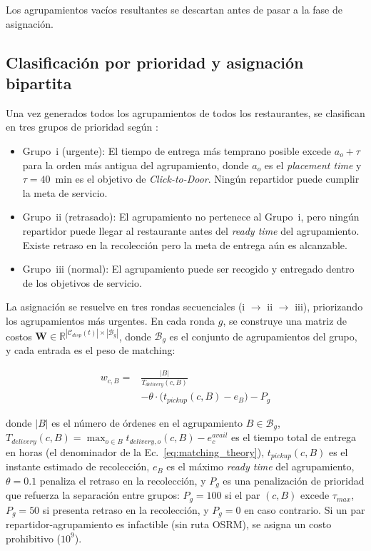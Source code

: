 \documentclass[12pt,letterpaper,oneside]{book}
\begin{document}
	Los agrupamientos vacíos resultantes se descartan antes de pasar a la fase de asignación.

	\subsection{Clasificación por prioridad y asignación bipartita}

	Una vez generados todos los agrupamientos de todos los restaurantes, se clasifican en tres 
	grupos de prioridad según \citet{Reyes2018}:

	\begin{itemize}
		\item Grupo~i (urgente): El tiempo de entrega más temprano posible excede
		$a_o + \tau$ para la orden más antigua del agrupamiento, donde $a_o$ es el
		\textit{placement time} y $\tau = 40$~min es el objetivo de \textit{Click-to-Door}. Ningún
		repartidor puede cumplir la meta de servicio.

		\item Grupo~ii (retrasado): El agrupamiento no pertenece al Grupo~i, pero
		ningún repartidor puede llegar al restaurante antes del \textit{ready time} del
		agrupamiento. Existe retraso en la recolección pero la meta de entrega aún es
		alcanzable.

		\item Grupo~iii (normal): El agrupamiento puede ser recogido y entregado
		dentro de los objetivos de servicio.
	\end{itemize}

	La asignación se resuelve en tres rondas secuenciales (i $\to$ ii $\to$ iii),
	priorizando los agrupamientos más urgentes. En cada ronda $g$, se construye una matriz de 
	costos $\mathbf{W} \in \mathbb{R}^{|\mathcal{C}_{disp}(t)| \times |\mathcal{B}_g|}$, donde
	$\mathcal{B}_g$ es el conjunto de agrupamientos del grupo, y cada
	entrada es el peso de matching:

	\begin{equation}
	\begin{aligned}
		w_{c,B} ={} & \frac{|B|}{T_{delivery}(c, B)} \\
		           & - \theta \cdot \bigl(t_{pickup}(c, B) - e_B\bigr) - P_g
	\end{aligned}
	\label{eq:matching_weight}
	\end{equation}

	\noindent donde $|B|$ es el número de órdenes en el agrupamiento $B \in \mathcal{B}_g$,
	$T_{delivery}(c, B) = \max_{o \in B} t_{delivery,o}(c,B) - e^{avail}_c$ es el tiempo
	total de entrega en horas (el denominador de la Ec.~\ref{eq:matching_theory}),
	$t_{pickup}(c, B)$ es el instante estimado de recolección, $e_B$ es el
	máximo \textit{ready time} del agrupamiento, $\theta = 0.1$ penaliza el retraso en 
	la recolección, y $P_g$ es una penalización de prioridad que refuerza la separación
	entre grupos: $P_g = 100$ si el par $(c, B)$ excede $\tau_{max}$,
	$P_g = 50$ si presenta retraso en la recolección, y $P_g = 0$ en caso contrario. Si un par 
	repartidor-agrupamiento es infactible (sin ruta OSRM), se asigna un costo prohibitivo 
	($10^9$).
\end{document}
